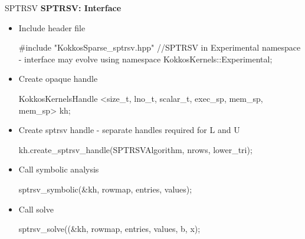 \begin{frame}[fragile]{SPTRSV}
\textbf{SPTRSV: Interface}

\begin{itemize}
  \item<2-> Include header file
  \begin{code}[keywords={parallel_reduce,for,int,double}, basicstyle=\tiny, breaklines=true]
#include "KokkosSparse_sptrsv.hpp"
//SPTRSV in Experimental namespace - interface may evolve
using namespace KokkosKernels::Experimental;
  \end{code}

  \item<3-> Create opaque handle
  \begin{code}[keywords={parallel_reduce,for,int,double}, basicstyle=\tiny, breaklines=true]
KokkosKernelsHandle 
<size_t, lno_t, scalar_t, exec_sp, mem_sp, mem_sp> kh;
  \end{code}

  \item<4-> Create sptrsv handle - separate handles required for L and U
  \begin{code}[keywords={parallel_reduce,for,int,double}, basicstyle=\tiny, breaklines=true]
kh.create_sptrsv_handle(SPTRSVAlgorithm, nrows, lower_tri);
  \end{code}

  \item<5-> Call symbolic analysis
  \begin{code}[keywords={parallel_reduce,for,int,double}, basicstyle=\tiny, breaklines=true]
sptrsv_symbolic(&kh, rowmap, entries, values);
  \end{code}

  \item<6-> Call solve
  \begin{code}[keywords={parallel_reduce,for,int,double}, basicstyle=\tiny, breaklines=true]
sptrsv_solve((&kh, rowmap, entries, values, b, x);
  \end{code}
\end{itemize}
\end{frame}


